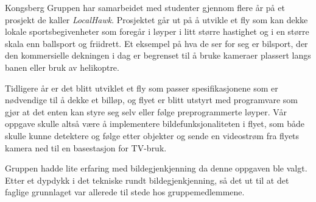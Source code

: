 Kongsberg Gruppen har samarbeidet med studenter gjennom flere år på et prosjekt de kaller \emph{LocalHawk}. Prosjektet går ut på å utvikle et fly som kan dekke lokale sportsbegivenheter som foregår i løyper i litt større hastighet og i en større skala enn ballsport og friidrett. Et eksempel på hva de ser for seg er bilsport, der den kommersielle dekningen i dag er begrenset til å bruke kameraer plassert langs banen eller bruk av helikoptre.

Tidligere år er det blitt utviklet et fly som passer spesifikasjonene som er nødvendige til å dekke et billøp, og flyet er blitt utstyrt med programvare som gjør at det enten kan styre seg selv eller følge preprogrammerte løyper. Vår oppgave skulle altså være å implementere bildefunksjonaliteten i flyet, som både skulle kunne detektere og følge etter objekter og sende en videostrøm fra flyets kamera ned til en basestasjon for TV-bruk.

Gruppen hadde lite erfaring med bildegjenkjenning da denne oppgaven ble valgt. Etter et dypdykk i det tekniske rundt bildegjenkjenning, så det ut til at det faglige grunnlaget var allerede til stede hos gruppemedlemmene.

